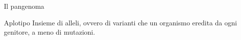 \documentclass[]{beamer}
\begin{document}
\begin{frame}{Il pangenoma}
{    \begin{block}{Aplotipo}
      Insieme di alleli, ovvero di
      varianti che un organismo eredita da ogni genitore, a meno di mutazioni.  
    \end{block}
  }
\end{frame}
\end{document}
